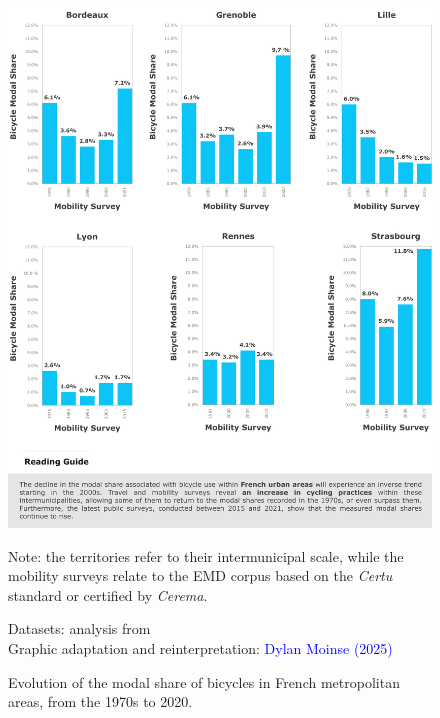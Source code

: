 \begin{refsegment}
\begin{figure}[h!]\vspace*{4pt}
    \caption{Evolution of the modal share of bicycles in French metropolitan areas, from the 1970s to 2020.}
    \label{fig-chap1:evolution-part-modale-velo}
    \centerline{\includegraphics[width=1\columnwidth]{src/Figures/Chap-1/EN_Part_modale_velo_evolution.pdf}}
    \vspace{5pt}
    \begin{flushleft}\scriptsize{
    Note: the territories refer to their intermunicipal scale, while the mobility surveys relate to the \acrfull{EMD} corpus based on the \textsl{Certu} standard or certified by \textsl{Cerema}.
    }\end{flushleft}
    \begin{flushright}\scriptsize{
    Datasets: analysis from \textcolor{blue}{\textcite[48]{certu_usagers_2013}}
    \\
    Graphic adaptation and reinterpretation: \textcolor{blue}{Dylan Moinse (2025)}
    }\end{flushright}
\end{figure}


\end{refsegment}
